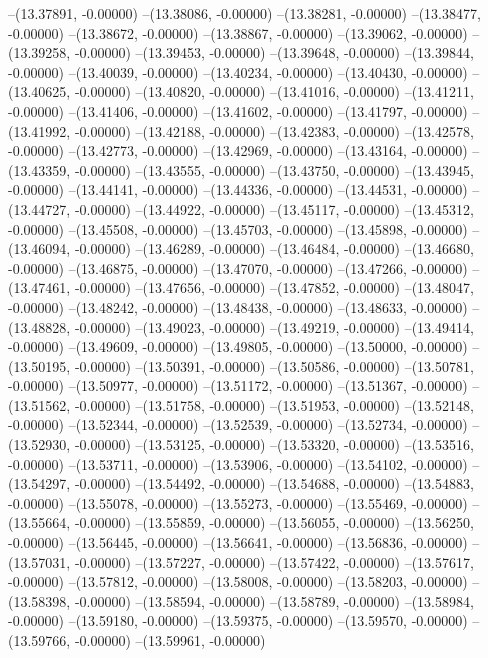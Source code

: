 --(13.37891, -0.00000)
--(13.38086, -0.00000)
--(13.38281, -0.00000)
--(13.38477, -0.00000)
--(13.38672, -0.00000)
--(13.38867, -0.00000)
--(13.39062, -0.00000)
--(13.39258, -0.00000)
--(13.39453, -0.00000)
--(13.39648, -0.00000)
--(13.39844, -0.00000)
--(13.40039, -0.00000)
--(13.40234, -0.00000)
--(13.40430, -0.00000)
--(13.40625, -0.00000)
--(13.40820, -0.00000)
--(13.41016, -0.00000)
--(13.41211, -0.00000)
--(13.41406, -0.00000)
--(13.41602, -0.00000)
--(13.41797, -0.00000)
--(13.41992, -0.00000)
--(13.42188, -0.00000)
--(13.42383, -0.00000)
--(13.42578, -0.00000)
--(13.42773, -0.00000)
--(13.42969, -0.00000)
--(13.43164, -0.00000)
--(13.43359, -0.00000)
--(13.43555, -0.00000)
--(13.43750, -0.00000)
--(13.43945, -0.00000)
--(13.44141, -0.00000)
--(13.44336, -0.00000)
--(13.44531, -0.00000)
--(13.44727, -0.00000)
--(13.44922, -0.00000)
--(13.45117, -0.00000)
--(13.45312, -0.00000)
--(13.45508, -0.00000)
--(13.45703, -0.00000)
--(13.45898, -0.00000)
--(13.46094, -0.00000)
--(13.46289, -0.00000)
--(13.46484, -0.00000)
--(13.46680, -0.00000)
--(13.46875, -0.00000)
--(13.47070, -0.00000)
--(13.47266, -0.00000)
--(13.47461, -0.00000)
--(13.47656, -0.00000)
--(13.47852, -0.00000)
--(13.48047, -0.00000)
--(13.48242, -0.00000)
--(13.48438, -0.00000)
--(13.48633, -0.00000)
--(13.48828, -0.00000)
--(13.49023, -0.00000)
--(13.49219, -0.00000)
--(13.49414, -0.00000)
--(13.49609, -0.00000)
--(13.49805, -0.00000)
--(13.50000, -0.00000)
--(13.50195, -0.00000)
--(13.50391, -0.00000)
--(13.50586, -0.00000)
--(13.50781, -0.00000)
--(13.50977, -0.00000)
--(13.51172, -0.00000)
--(13.51367, -0.00000)
--(13.51562, -0.00000)
--(13.51758, -0.00000)
--(13.51953, -0.00000)
--(13.52148, -0.00000)
--(13.52344, -0.00000)
--(13.52539, -0.00000)
--(13.52734, -0.00000)
--(13.52930, -0.00000)
--(13.53125, -0.00000)
--(13.53320, -0.00000)
--(13.53516, -0.00000)
--(13.53711, -0.00000)
--(13.53906, -0.00000)
--(13.54102, -0.00000)
--(13.54297, -0.00000)
--(13.54492, -0.00000)
--(13.54688, -0.00000)
--(13.54883, -0.00000)
--(13.55078, -0.00000)
--(13.55273, -0.00000)
--(13.55469, -0.00000)
--(13.55664, -0.00000)
--(13.55859, -0.00000)
--(13.56055, -0.00000)
--(13.56250, -0.00000)
--(13.56445, -0.00000)
--(13.56641, -0.00000)
--(13.56836, -0.00000)
--(13.57031, -0.00000)
--(13.57227, -0.00000)
--(13.57422, -0.00000)
--(13.57617, -0.00000)
--(13.57812, -0.00000)
--(13.58008, -0.00000)
--(13.58203, -0.00000)
--(13.58398, -0.00000)
--(13.58594, -0.00000)
--(13.58789, -0.00000)
--(13.58984, -0.00000)
--(13.59180, -0.00000)
--(13.59375, -0.00000)
--(13.59570, -0.00000)
--(13.59766, -0.00000)
--(13.59961, -0.00000)
